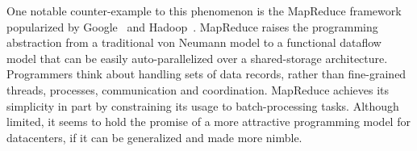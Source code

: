 \documentclass{sig-alternate}
\begin{document}
One notable counter-example to this phenomenon is the MapReduce framework popularized by Google~\cite{mapreduce-osdi} and Hadoop~\cite{hadoop}.  MapReduce raises the programming abstraction from a traditional von Neumann model to a functional dataflow model that can be easily auto-parallelized over a shared-storage architecture.   Programmers think about handling sets of data records, rather than fine-grained threads, processes, communication and coordination.  
MapReduce achieves its simplicity in part by constraining its usage to batch-processing tasks.  Although limited, it seems to hold the promise of a more attractive programming model for datacenters, if it can be generalized and made more nimble.
% 
% 
% 
% 
% 
\end{document}
